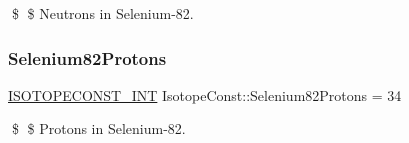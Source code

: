 \$ \$ Neutrons in Selenium-\/82. \mbox{\label{group___isotope_const-_selenium-_se82_ga6bc74e228f83b6f1fed2179a7b1a9330}} 
\subsubsection{\texorpdfstring{Selenium82\+Protons}{Selenium82Protons}}
{\footnotesize\ttfamily \mbox{\hyperlink{group___isotope_const-_macros_ga5f18360b3e99483a35c32d789e62621c}{I\+S\+O\+T\+O\+P\+E\+C\+O\+N\+S\+T\+\_\+\+I\+NT}} Isotope\+Const\+::\+Selenium82\+Protons = 34}

\$ \$ Protons in Selenium-\/82. 